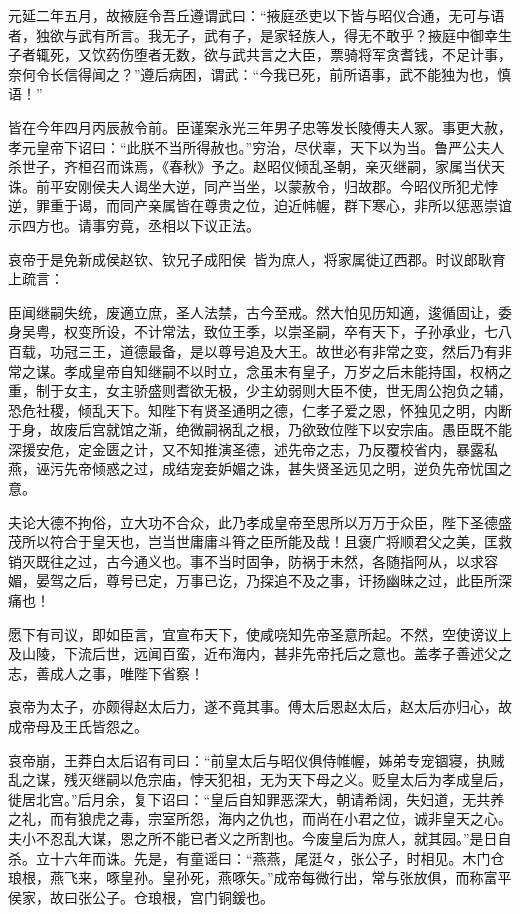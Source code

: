 \documentclass[]{article}
\begin{document}
元延二年五月，故掖庭令吾丘遵谓武曰：``掖庭丞吏以下皆与昭仪合通，无可与语者，独欲与武有所言。我无子，武有子，是家轻族人，得无不敢乎？掖庭中御幸生子者辄死，又饮药伤堕者无数，欲与武共言之大臣，票骑将军贪耆钱，不足计事，奈何令长信得闻之？''遵后病困，谓武：``今我已死，前所语事，武不能独为也，慎语！''

皆在今年四月丙辰赦令前。臣谨案永光三年男子忠等发长陵傅夫人冢。事更大赦，孝元皇帝下诏曰：``此朕不当所得赦也。''穷治，尽伏辜，天下以为当。鲁严公夫人杀世子，齐桓召而诛焉，《春秋》予之。赵昭仪倾乱圣朝，亲灭继嗣，家属当伏天诛。前平安刚侯夫人谒坐大逆，同产当坐，以蒙赦令，归故郡。今昭仪所犯尤悖逆，罪重于谒，而同产亲属皆在尊贵之位，迫近帏幄，群下寒心，非所以惩恶崇谊示四方也。请事穷竟，丞相以下议正法。

哀帝于是免新成侯赵钦、钦兄子成阳侯，皆为庶人，将家属徙辽西郡。时议郎耿育上疏言：

臣闻继嗣失统，废適立庶，圣人法禁，古今至戒。然大怕见历知適，逡循固让，委身吴粤，权变所设，不计常法，致位王季，以崇圣嗣，卒有天下，子孙承业，七八百载，功冠三王，道德最备，是以尊号追及大王。故世必有非常之变，然后乃有非常之谋。孝成皇帝自知继嗣不以时立，念虽末有皇子，万岁之后未能持国，权柄之重，制于女主，女主骄盛则耆欲无极，少主幼弱则大臣不使，世无周公抱负之辅，恐危社稷，倾乱天下。知陛下有贤圣通明之德，仁孝子爱之恩，怀独见之明，内断于身，故废后宫就馆之渐，绝微嗣祸乱之根，乃欲致位陛下以安宗庙。愚臣既不能深援安危，定金匮之计，又不知推演圣德，述先帝之志，乃反覆校省内，暴露私燕，诬污先帝倾惑之过，成结宠妾妒媚之诛，甚失贤圣远见之明，逆负先帝忧国之意。

夫论大德不拘俗，立大功不合众，此乃孝成皇帝至思所以万万于众臣，陛下圣德盛茂所以符合于皇天也，岂当世庸庸斗筲之臣所能及哉！且褒广将顺君父之美，匡救销灭既往之过，古今通义也。事不当时固争，防祸于未然，各随指阿从，以求容媚，晏驾之后，尊号已定，万事已讫，乃探追不及之事，讦扬幽昧之过，此臣所深痛也！

愿下有司议，即如臣言，宜宣布天下，使咸哓知先帝圣意所起。不然，空使谤议上及山陵，下流后世，远闻百蛮，近布海内，甚非先帝托后之意也。盖孝子善述父之志，善成人之事，唯陛下省察！

哀帝为太子，亦颇得赵太后力，遂不竟其事。傅太后恩赵太后，赵太后亦归心，故成帝母及王氏皆怨之。

哀帝崩，王莽白太后诏有司曰：``前皇太后与昭仪俱侍帷幄，姊弟专宠锢寝，执贼乱之谋，残灭继嗣以危宗庙，悖天犯祖，无为天下母之义。贬皇太后为孝成皇后，徙居北宫。''后月余，复下诏曰：``皇后自知罪恶深大，朝请希阔，失妇道，无共养之礼，而有狼虎之毒，宗室所怨，海内之仇也，而尚在小君之位，诚非皇天之心。夫小不忍乱大谋，恩之所不能已者义之所割也。今废皇后为庶人，就其园。''是日自杀。立十六年而诛。先是，有童谣曰：``燕燕，尾涏々，张公子，时相见。木门仓琅根，燕飞来，啄皇孙。皇孙死，燕啄矢。''成帝每微行出，常与张放俱，而称富平侯家，故曰张公子。仓琅根，宫门铜鍰也。
\end{document}
